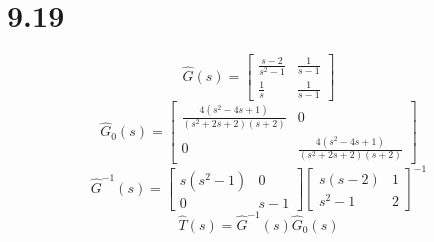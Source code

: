 \documentclass{article}
\begin{document}
\section*{9.19}
\[\hat{G}(s)=
\left[
\begin{array}{cc}
    \frac{s-2}{s^2-1} & \frac{1}{s-1}\\
    \frac{1}{s} & \frac{1}{s-1}
\end{array}
\right]
\]
\[\hat{G}_0(s)=
\left[
\begin{array}{cc}
    \frac{4(s^2-4s+1)}{(s^2+2s+2)(s+2)} & 0\\
    0 & \frac{4(s^2-4s+1)}{(s^2+2s+2)(s+2)} 
\end{array}
\right]
\]
\[\hat{G}^{-1}(s)=
\left[
\begin{array}{cc}
  s(s^2-1) & 0 \\
    0 & s-1
\end{array}
\right]\left[ 
    \begin{array}{cc}
    s(s-2) & 1\\
    s^2-1 & 2
    \end{array}
\right]^{-1}
\]
\[\hat{T}(s)=\hat{G}^{-1}(s)\hat{G}_0(s)\]
\end{document}
